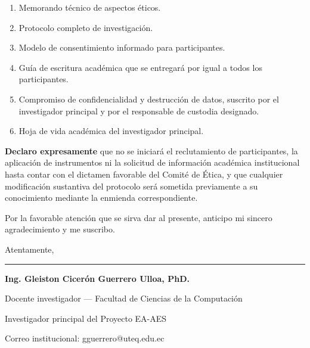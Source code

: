\documentclass[11pt,a4paper]{article}
\newcommand{\campo}[1]{\rule{#1}{0.4pt}}
\begin{document}
\begin{enumerate}[label=\textbf{\arabic*.},leftmargin=1.0cm]
	\item Memorando t\'ecnico de aspectos \'eticos.
	\item Protocolo completo de investigaci\'on.
	\item Modelo de consentimiento informado para participantes.
	\item Gu\'ia de escritura acad\'emica que se entregar\'a por igual a todos los participantes.
	\item Compromiso de confidencialidad y destrucci\'on de datos, suscrito por el investigador principal y por el responsable de custodia designado.
	\item Hoja de vida acad\'emica del investigador principal.
\end{enumerate}

\textbf{Declaro expresamente} que no se iniciar\'a el reclutamiento de participantes, la aplicaci\'on de instrumentos ni la solicitud de informaci\'on acad\'emica institucional hasta contar con el dictamen favorable del Comit\'e de \'Etica, y que cualquier modificaci\'on sustantiva del protocolo ser\'a sometida previamente a su conocimiento mediante la enmienda correspondiente.

Por la favorable atenci\'on que se sirva dar al presente, anticipo mi sincero agradecimiento y me suscribo.

\vspace{16pt}
Atentamente,

\vspace{48pt}
\campo{7.6cm}

\textbf{Ing. Gleiston Cicer\'on Guerrero Ulloa, PhD.}

{\small Docente investigador --- Facultad de Ciencias de la Computaci\'on}

{\small Investigador principal del Proyecto EA-AES}

{\small Correo institucional: gguerrero@uteq.edu.ec}
\end{document}
